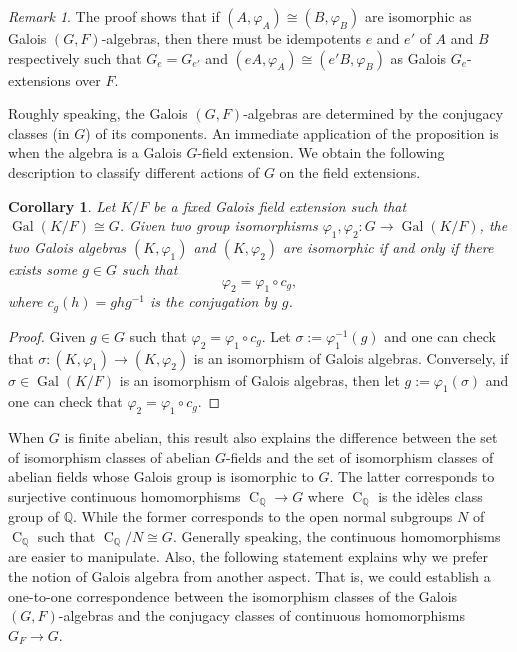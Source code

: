 \documentclass[12pt,a4paper]{amsart}
\numberwithin{equation}{section}%
\theoremstyle{plain}%
\newtheorem{corollary}[theorem]{Corollary}%
\theoremstyle{definition}%
\theoremstyle{remark}%
\newtheorem*{remark}{Remark}%
\begin{document}
	\begin{remark}
		The proof shows that if $(A,\varphi_A)\cong(B,\varphi_B)$ are isomorphic as Galois $(G,F)$-algebras, then there must be idempotents $e$ and $e'$ of $A$ and $B$ respectively such that $G_e=G_{e'}$ and $(eA,\varphi_A)\cong(e'B,\varphi_B)$ as Galois $G_e$-extensions over $F$.
	\end{remark}
	Roughly speaking, the Galois $(G,F)$-algebras are determined by the conjugacy classes (in $G$) of its components.
	An immediate application of the proposition is when the algebra is a Galois $G$-field extension.
	We obtain the following description to classify different actions of $G$ on the field extensions.
	\begin{corollary}\label{cor: Galois G-extensions}
		Let $K/F$ be a fixed Galois field extension such that $\operatorname{Gal}(K/F)\cong G$.
		Given two group isomorphisms $\varphi_1,\varphi_2:G\to\operatorname{Gal}(K/F)$, the two Galois algebras $(K,\varphi_1)$ and $(K,\varphi_2)$ are isomorphic if and only if there exists some $g\in G$ such that
		\begin{equation*}
			\varphi_2=\varphi_1\circ c_g,
		\end{equation*}
		where $c_g(h)=ghg^{-1}$ is the conjugation by $g$.
	\end{corollary}
	\begin{proof}
		Given $g\in G$ such that $\varphi_2=\varphi_1\circ c_g$.
		Let $\sigma:=\varphi_1^{-1}(g)$ and one can check that $\sigma:(K,\varphi_1)\to(K,\varphi_2)$ is an isomorphism of Galois algebras.
		Conversely, if $\sigma\in\operatorname{Gal}(K/F)$ is an isomorphism of Galois algebras, then let $g:=\varphi_1(\sigma)$ and one can check that $\varphi_2=\varphi_1\circ c_g$.
	\end{proof}
	When $G$ is finite abelian, this result also explains the difference between the set of isomorphism classes of abelian $G$-fields and the set of isomorphism classes of abelian fields whose Galois group is isomorphic to $G$.
	The latter corresponds to surjective continuous homomorphisms $\operatorname{C}_{\mathbb{Q}}\to G$ where $\operatorname{C}_{\mathbb{Q}}$ is the id{\`e}les class group of $\mathbb{Q}$.
	While the former corresponds to the open normal subgroups $N$ of $\operatorname{C}_{\mathbb{Q}}$ such that $\operatorname{C}_{\mathbb{Q}}/N\cong G$.
	Generally speaking, the continuous homomorphisms are easier to manipulate.
	Also, the following statement explains why we prefer the notion of Galois algebra from another aspect.
	That is, we could establish a one-to-one correspondence between the isomorphism classes of the Galois $(G,F)$-algebras and the conjugacy classes of continuous homomorphisms $G_{F}\to G$.
\end{document}

